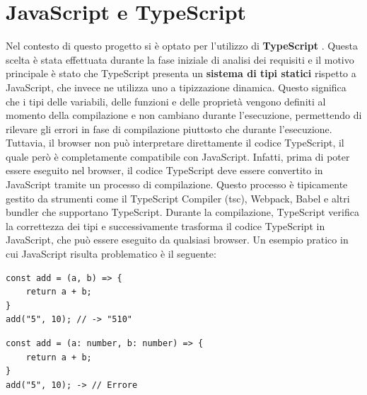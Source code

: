 \documentclass[target=bach,aauheader=,style=]{thud}
\begin{document}
\section{JavaScript e TypeScript}
Nel contesto di questo progetto si è optato per l'utilizzo di \textbf{TypeScript} \cite{wikipedia:typescript}. Questa scelta è stata effettuata durante la fase iniziale di analisi dei requisiti e il motivo principale è stato che TypeScript presenta un \textbf{sistema di tipi statici} rispetto a JavaScript, che invece ne utilizza uno a tipizzazione dinamica. Questo significa che i tipi delle variabili, delle funzioni e delle proprietà vengono definiti al momento della compilazione e non cambiano durante l'esecuzione, permettendo di rilevare gli errori in fase di compilazione piuttosto che durante l'esecuzione. Tuttavia, il browser non può interpretare direttamente il codice TypeScript, il quale però è completamente compatibile con JavaScript. Infatti, prima di poter essere eseguito nel browser, il codice TypeScript deve essere convertito in JavaScript tramite un processo di compilazione. Questo processo è tipicamente gestito da strumenti come il TypeScript Compiler (tsc), Webpack, Babel e altri bundler che supportano TypeScript. Durante la compilazione, TypeScript verifica la correttezza dei tipi e successivamente trasforma il codice TypeScript in JavaScript, che può essere eseguito da qualsiasi browser. Un esempio pratico in cui JavaScript risulta problematico è il seguente: 

\begin{minipage}[t]{0.45\textwidth}
    \begin{lstlisting}[caption=Coercion in JavaScript]
const add = (a, b) => {
    return a + b;
}   
add("5", 10); // -> "510"
    \end{lstlisting}
\end{minipage}
\hfill
\begin{minipage}[t]{0.45\textwidth}
    \begin{lstlisting}[caption=Errore in TypeScript]
const add = (a: number, b: number) => {
    return a + b;
}  
add("5", 10); -> // Errore
    \end{lstlisting}
\end{minipage}
\end{document}
